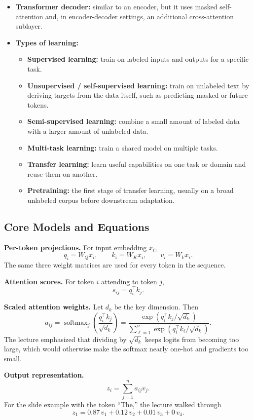\documentclass[11pt]{article}
\begin{document}
\begin{itemize}
    \item \textbf{Transformer decoder:} similar to an encoder, but it uses masked self-attention and, in encoder-decoder settings, an additional cross-attention sublayer.
    \item \textbf{Types of learning:}
    \begin{itemize}
        \item \textbf{Supervised learning:} train on labeled inputs and outputs for a specific task.
        \item \textbf{Unsupervised / self-supervised learning:} train on unlabeled text by deriving targets from the data itself, such as predicting masked or future tokens.
        \item \textbf{Semi-supervised learning:} combine a small amount of labeled data with a larger amount of unlabeled data.
        \item \textbf{Multi-task learning:} train a shared model on multiple tasks.
        \item \textbf{Transfer learning:} learn useful capabilities on one task or domain and reuse them on another.
        \item \textbf{Pretraining:} the first stage of transfer learning, usually on a broad unlabeled corpus before downstream adaptation.
    \end{itemize}
\end{itemize}

\subsection{Core Models and Equations}
\textbf{Per-token projections.} For input embedding \(x_i\),
\[
q_i = W_Q x_i, \qquad k_i = W_K x_i, \qquad v_i = W_V x_i.
\]
The same three weight matrices are used for every token in the sequence.

\textbf{Attention scores.} For token \(i\) attending to token \(j\),
\[
s_{ij} = q_i^\top k_j.
\]

\textbf{Scaled attention weights.} Let \(d_k\) be the key dimension. Then
\[
a_{ij} = \operatorname{softmax}_j\!\left(\frac{q_i^\top k_j}{\sqrt{d_k}}\right)
= \frac{\exp\!\left(q_i^\top k_j / \sqrt{d_k}\right)}
{\sum_{\ell=1}^{n} \exp\!\left(q_i^\top k_\ell / \sqrt{d_k}\right)}.
\]
The lecture emphasized that dividing by \(\sqrt{d_k}\) keeps logits from becoming too large, which would otherwise make the softmax nearly one-hot and gradients too small.

\textbf{Output representation.}
\[
z_i = \sum_{j=1}^{n} a_{ij} v_j.
\]
For the slide example with the token ``The,'' the lecture walked through
\[
z_1 = 0.87\,v_1 + 0.12\,v_2 + 0.01\,v_3 + 0\,v_4.
\]
\end{document}
